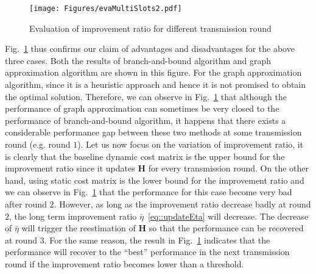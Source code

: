 %
\begin{figure}
\begin{center}
\texttt{[image: Figures/evaMultiSlots2.pdf]}
\caption{\label{fig::evaMultiSlots}Evaluation of improvement ratio for different transmission round}
\end{center}
\end{figure}
%
Fig.~\ref{fig::evaMultiSlots} thus confirms our claim of advantages and disadvantages for the above three cases.
Both the results of branch-and-bound algorithm and graph approximation algorithm are shown in this figure.
For the graph approximation algorithm, since it is a heuristic approach and hence it is not promised to obtain the optimal solution.
Therefore, we can observe in Fig.~\ref{fig::evaMultiSlots} that although the performance of graph approximation can sometimes be very closed to the performance of branch-and-bound algorithm, it happens that there exists a considerable performance gap between these two methods at some transmission round (e.g. round $1$).
Let us now focus on the variation of improvement ratio, it is clearly that the baseline dynamic cost matrix is the upper bound for the improvement ratio since it updates $\mathbf{H}$ for every transmission round.
On the other hand, using static cost matrix is the lower bound for the improvement ratio and we can observe in Fig.~\ref{fig::evaMultiSlots} that the performance for this case become very bad after round $2$.
However, as long as the improvement ratio decrease badly at round $2$, the long term improvement ratio $\bar{\eta}$~\eqref{eq::updateEta} will decrease.
The decrease of $\bar{\eta}$ will trigger the reestimation of $\mathbf{H}$ so that the performance can be recovered at round $3$.
For the same reason, the result in Fig.~\ref{fig::evaMultiSlots} indicates that the performance will recover to the ``best'' performance in the next transmission round if the improvement ratio becomes lower than a threshold.

